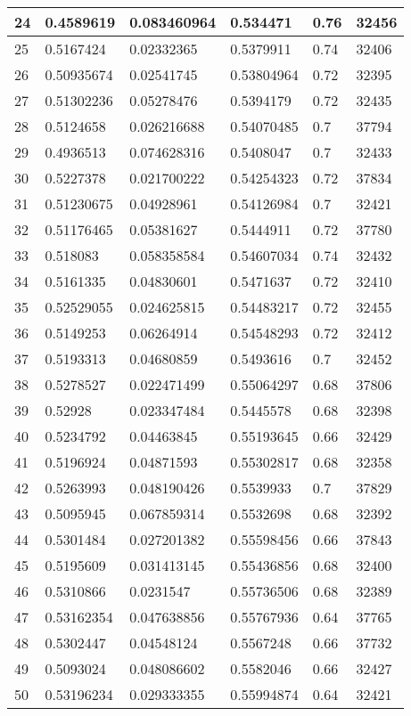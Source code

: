 \begin{longtable}{|l|l|l|l|l|l|}
24 & 0.4589619 & 0.083460964 & 0.534471 & 0.76 & 32456 \\ \hline 
25 & 0.5167424 & 0.02332365 & 0.5379911 & 0.74 & 32406 \\ \hline 
26 & 0.50935674 & 0.02541745 & 0.53804964 & 0.72 & 32395 \\ \hline 
27 & 0.51302236 & 0.05278476 & 0.5394179 & 0.72 & 32435 \\ \hline 
28 & 0.5124658 & 0.026216688 & 0.54070485 & 0.7 & 37794 \\ \hline 
29 & 0.4936513 & 0.074628316 & 0.5408047 & 0.7 & 32433 \\ \hline 
30 & 0.5227378 & 0.021700222 & 0.54254323 & 0.72 & 37834 \\ \hline 
31 & 0.51230675 & 0.04928961 & 0.54126984 & 0.7 & 32421 \\ \hline 
32 & 0.51176465 & 0.05381627 & 0.5444911 & 0.72 & 37780 \\ \hline 
33 & 0.518083 & 0.058358584 & 0.54607034 & 0.74 & 32432 \\ \hline 
34 & 0.5161335 & 0.04830601 & 0.5471637 & 0.72 & 32410 \\ \hline 
35 & 0.52529055 & 0.024625815 & 0.54483217 & 0.72 & 32455 \\ \hline 
36 & 0.5149253 & 0.06264914 & 0.54548293 & 0.72 & 32412 \\ \hline 
37 & 0.5193313 & 0.04680859 & 0.5493616 & 0.7 & 32452 \\ \hline 
38 & 0.5278527 & 0.022471499 & 0.55064297 & 0.68 & 37806 \\ \hline 
39 & 0.52928 & 0.023347484 & 0.5445578 & 0.68 & 32398 \\ \hline 
40 & 0.5234792 & 0.04463845 & 0.55193645 & 0.66 & 32429 \\ \hline 
41 & 0.5196924 & 0.04871593 & 0.55302817 & 0.68 & 32358 \\ \hline 
42 & 0.5263993 & 0.048190426 & 0.5539933 & 0.7 & 37829 \\ \hline 
43 & 0.5095945 & 0.067859314 & 0.5532698 & 0.68 & 32392 \\ \hline 
44 & 0.5301484 & 0.027201382 & 0.55598456 & 0.66 & 37843 \\ \hline 
45 & 0.5195609 & 0.031413145 & 0.55436856 & 0.68 & 32400 \\ \hline 
46 & 0.5310866 & 0.0231547 & 0.55736506 & 0.68 & 32389 \\ \hline 
47 & 0.53162354 & 0.047638856 & 0.55767936 & 0.64 & 37765 \\ \hline 
48 & 0.5302447 & 0.04548124 & 0.5567248 & 0.66 & 37732 \\ \hline 
49 & 0.5093024 & 0.048086602 & 0.5582046 & 0.66 & 32427 \\ \hline 
50 & 0.53196234 & 0.029333355 & 0.55994874 & 0.64 & 32421 \\ \hline 
\end{longtable}